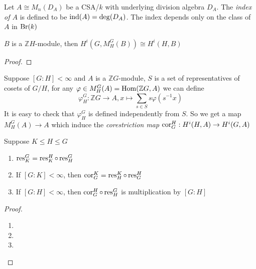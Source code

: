 \documentclass[a4paper,10pt]{article}
\begin{document}
\begin{definition}
Let $A\cong M_n(D_A)$ be a CSA/$k$ with underlying division algebra $D_A$. The \textit{index of $A$} is defined to be $\operatorname{ind}(A)=\deg(D_A)$. The index depends only on the class of $A$ in $\operatorname{Br}(k)$
\end{definition}

\begin{lemma}\label{Shapiro's lemma}
$B$ is a $\mathbb ZH$-module, then $H^i(G,M^G_H(B))\cong H^i(H,B)$
\end{lemma}

\begin{proof}

\end{proof}

\begin{definition}
Suppose $[G:H]<\infty$ and $A$ is a $\mathbb ZG$-module, $S$ is a set of representatives of cosets of $G/H$, for any $\varphi\in M^G_H(A)=\operatorname{Hom}(\mathbb ZG,A)$ we can define
\[
\varphi^G_H:\mathbb ZG\to A, x\mapsto\sum_{s\in S}s\varphi(s^{-1}x)
\]
It is easy to check that $\varphi^G_H$ is defined independently from $S$. So we get a map $M^G_H(A)\to A$ which induce the \textit{corestriction map} $\operatorname{cor}^H_G:H^i(H,A)\to H^i(G,A)$
\end{definition}

\begin{proposition}\label{01:02-04/28/2022}
Suppose $K\leq H\leq G$
\begin{enumerate}
\item $\operatorname{res}^G_K=\operatorname{res}^H_K\circ\operatorname{res}^G_H$
\item If $[G:K]<\infty$, then $\operatorname{cor}^K_G=\operatorname{res}^K_H\circ\operatorname{res}^H_G$
\item If $[G:H]<\infty$, then $\operatorname{cor}^H_G\circ\operatorname{res}^G_H$ is multiplication by $[G:H]$
\end{enumerate}
\end{proposition}

\begin{proof}
\begin{enumerate}
\item
\item
\item
\end{enumerate}
\end{proof}
\end{document}
